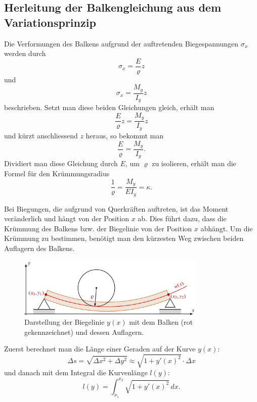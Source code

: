 \subsection{Herleitung der Balkengleichung aus dem Variationsprinzip}
Die Verformungen des Balkens aufgrund der auftretenden Biegespannungen $\sigma_x$ werden durch
\begin{equation}
	\sigma_x = \frac{E}{\varrho} z
\end{equation}
und
\begin{equation}
	\sigma_x = \frac{M_y}{I_y} z
\end{equation}
beschrieben. Setzt man diese beiden Gleichungen gleich, erhält man
\begin{equation}
	\frac{E}{\varrho} z = \frac{M_y}{I_y} z
\end{equation}
und kürzt anschliessend $z$ heraus, so bekommt man
\begin{equation}
	\frac{E}{\varrho} = \frac{M_y}{I_y}.
\end{equation}
Dividiert man diese Gleichung durch $E$, um $\varrho$ zu isolieren, erhält man die Formel für den Krümmungsradius
\begin{equation}
	\frac{1}{\varrho} = \frac{M_y}{E I_y} = \kappa.
\end{equation}

Bei Biegungen, die aufgrund von Querkräften auftreten, ist das Moment veränderlich und hängt von der Position $x$ ab. Dies führt dazu, dass die Krümmung des Balkens bzw. der Biegelinie von der Position $x$ abhängt. Um die Krümmung zu bestimmen, benötigt man den kürzesten Weg zwischen beiden Auflagern des Balkens.
\begin{figure}
	\centering
	\includegraphics[width=0.8\textwidth]{papers/balken/images/teil2/BiegungBalke2.jpg}
	\caption{Darstellung der Biegelinie $y(x)$ mit dem Balken (rot gekennzeichnet) und dessen Auflagern.}
	\label{fig:Darstellung_der_Biegelinie}
\end{figure}

Zuerst berechnet man die Länge einer Geraden auf der Kurve $y(x)$:
\begin{equation}
	\Delta s = \sqrt{\Delta x^2 + \Delta y^2} \approx \sqrt{1 + y'(x)^2} \cdot \Delta x
\end{equation}
und danach mit dem Integral die Kurvenlänge $l(y)$:
\begin{equation}
	l(y) = \int_{x_1}^{x_2} \sqrt{1 + {y'(x)}^2} \, dx.
\end{equation}

